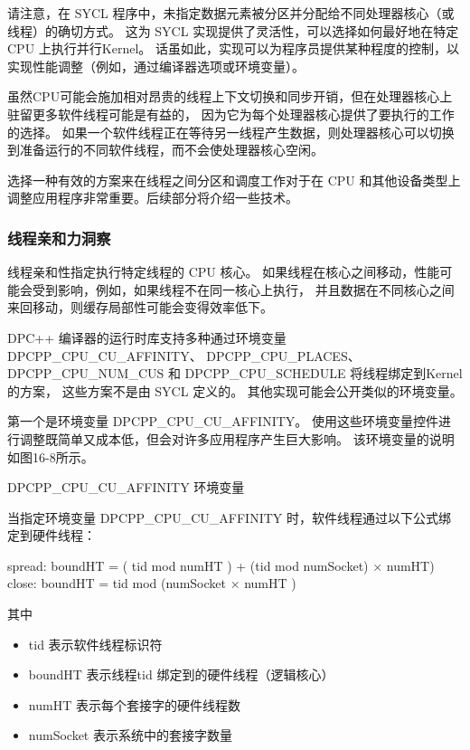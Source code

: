 请注意，在 SYCL 程序中，未指定数据元素被分区并分配给不同处理器核心（或线程）的确切方式。 
这为 SYCL 实现提供了灵活性，可以选择如何最好地在特定 CPU 上执行并行Kernel。 
话虽如此，实现可以为程序员提供某种程度的控制，以实现性能调整（例如，通过编译器选项或环境变量）。

虽然CPU可能会施加相对昂贵的线程上下文切换和同步开销，但在处理器核心上驻留更多软件线程可能是有益的，
因为它为每个处理器核心提供了要执行的工作的选择。 
如果一个软件线程正在等待另一线程产生数据，则处理器核心可以切换到准备运行的不同软件线程，而不会使处理器核心空闲。

\begin{remark}[选择如何绑定和调度线程]
选择一种有效的方案来在线程之间分区和调度工作对于在 CPU 和其他设备类型上调整应用程序非常重要。后续部分将介绍一些技术。
\end{remark}

\subsubsection{线程亲和力洞察}
线程亲和性指定执行特定线程的 CPU 核心。 
如果线程在核心之间移动，性能可能会受到影响，例如，如果线程不在同一核心上执行，
并且数据在不同核心之间来回移动，则缓存局部性可能会变得效率低下。

DPC++ 编译器的运行时库支持多种通过环境变量 DPCPP\_CPU\_CU\_AFFINITY、
DPCPP\_CPU\_PLACES、DPCPP\_CPU\_NUM\_CUS 和 DPCPP\_CPU\_SCHEDULE 将线程绑定到Kernel的方案，
这些方案不是由 SYCL 定义的。 
其他实现可能会公开类似的环境变量。

第一个是环境变量 DPCPP\_CPU\_CU\_AFFINITY。 
使用这些环境变量控件进行调整既简单又成本低，但会对许多应用程序产生巨大影响。 该环境变量的说明如图16-8所示。

{\color{red} DPCPP\_CPU\_CU\_AFFINITY 环境变量}

当指定环境变量 DPCPP\_CPU\_CU\_AFFINITY 时，软件线程通过以下公式绑定到硬件线程：

spread: boundHT = ( tid mod numHT ) + (tid mod numSocket) × numHT) close: boundHT = tid mod (numSocket × numHT )

其中

\begin{itemize}
	\item tid 表示软件线程标识符

	\item boundHT 表示线程tid 绑定到的硬件线程（逻辑核心）

	\item numHT 表示每个套接字的硬件线程数

	\item numSocket 表示系统中的套接字数量
\end{itemize}

